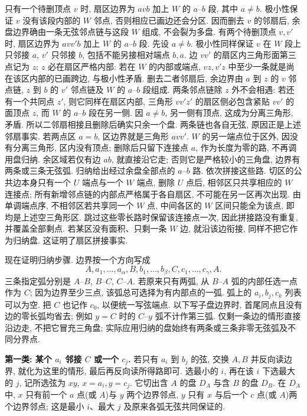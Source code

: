 \begin{solution}
只有一个待删顶点 $v$ 时, 扇区边界为 $avb$ 加上 $W$ 的 $a$--$b$ 段,
其中 $a\ne b$. 极小性保证 $v$ 没有该段内部的 $W$ 邻点,
否则相应已画边还会分区. 因而删去 $v$ 的邻扇后,
余盘边界确由一条无弦邻点链与这段 $W$ 组成, 不会裂为多盘.
有两个待删顶点 $v,v'$ 时, 扇区边界为 $avv'b$ 加上 $W$ 的 $a$--$b$ 段.
先设 $a\ne b$. 极小性同样保证 $v$ 在 $W$ 段上只邻接 $a$,
$v'$ 只邻接 $b$, 包括不能另接相对端点 $b,a$.
边 $vv'$ 的扇区内三角形面第三点记为 $z$;
$z$ 必在扇区严格内部: 若在 $W$ 的内部或端点,
$vz,v'z$ 中至少一条就是尚在该区内部的已画跨边, 与极小性矛盾.
删去二者邻扇后, 余边界由 $a$ 到 $z$ 的 $v$ 邻点链,
$z$ 到 $b$ 的 $v'$ 邻点链及 $W$ 的 $a$--$b$ 段组成.
两条邻点链除 $z$ 外不会相遇: 若还有一个共同点 $z'$,
则它同样在扇区内部, 三角形 $vv'z'$ 的扇区侧必包含紧贴 $vv'$ 的面顶点 $z$,
而 $W$ 的 $a$--$b$ 段在另一侧. 因 $a\ne b$, 另一侧有顶点,
这成为分离三角形, 矛盾. 所以二邻扇相接且删除后确实只余一个盘.
两条链也各自无弦, 原因正是上述邻扇事实.
若两点区 $a=b$, 区边界就是三角形 $avv'$.
$W$ 的另一端点位于区外, 因没有分离三角形, 区内没有顶点;
删除后只留下连接点 $a$, 作为长度为零的路, 不再调用盘归纳.
余区域若仅有边 $ab$, 就直接沿它走; 否则它是严格较小的三角盘,
边界有两条或三条无弦弧. 归纳给出经过余盘全部点的 $a$--$b$ 路.
依次拼接这些路. 切区的公共边本身只有一个 $U$ 端点与一个 $W$ 端点,
删除 $U$ 点后, 相邻区只共享相应的 $W$ 连接点;
所有新增邻点链的内部点严格属于各自扇区, 不可能在另一区再次出现.
由单调端点序, 不相邻区若共享同一个 $W$ 点, 中间各区的 $W$ 区间只能全为该点,
即均是上述空三角形区. 跳过这些零长路时保留该连接点一次,
因此拼接路没有重复, 并覆盖全部剩点. 若某区没有面积、只剩一条 $W$ 边,
就沿该边衔接, 同样不把它作为归纳盘.
这证明了扇区拼接事实.

现在证明归纳步骤. 边界按一个方向写成
\[
A,a_1,\ldots,a_\alpha,B,b_1,\ldots,b_\beta,
C,c_1,\ldots,c_\gamma,A.
\]
三条指定弧分别是 $A$--$B$, $B$--$C$, $C$--$A$.
若原来只有两弧, 从 $B$--$A$ 弧的内部任选一点作为 $C$;
因为边界至少三点, 该弧总可选择为有内部点的一弧.
弧上的 $a_i,b_j,c_k$ 列表可以为空.
把 $C$ 也记作 $c_0$, 以便统一写弦端点.
以下写子盘边界时, 首尾同点且没有边的零长弧均省去;
例如 $y=C$ 时的 $C$--$y$ 弧不计作第三弧.
仅剩一条边的情形直接沿边走, 不把它冒充三角盘;
实际应用归纳的盘始终有两条或三条非零无弦弧及不同分界点.

\textbf{第一类: 某个 $a_i$ 邻接 $C$ 或一个 $c_j$.}
若只有 $a_i$ 到 $b_j$ 的弦, 交换 $A,B$ 并反向读边界,
就化为这里的情形, 最后再反向读所得路即可.
选最小的 $i$, 再在该 $i$ 下选最大的 $j$, 记所选弦为 $xy$, $x=a_i,y=c_j$.
它切出含 $A$ 的盘 $D_A$ 与含 $B$ 的盘 $D_B$.
在 $D_A$ 中, $x$ 只有前一个 $a$ 点(或 $A$)与 $y$ 两个边界邻点,
$y$ 只有 $x$ 与后一个 $c$ 点(或 $A$)两个边界邻点;
这是最小 $i$、最大 $j$ 及原来各弧无弦共同保证的.


\end{solution}
